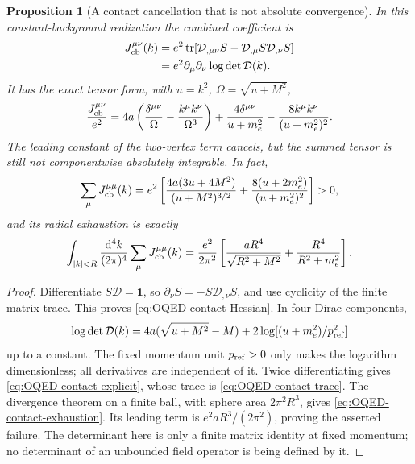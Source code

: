 \documentclass[final,5p,times,twocolumn,numbers,nopreprintline]{elsarticle}
\numberwithin{equation}{section}
\newtheorem{proposition}[theorem]{Proposition}
\theoremstyle{definition}
\theoremstyle{remark}
\newcommand{\dd}{\mathop{}\!\mathrm d}
\newcommand{\Tr}{\operatorname{tr}}
\newcommand{\one}{\mathbf 1}
\begin{document}
\begin{proposition}[A contact cancellation that is not absolute convergence]
\label{prop:OQED-constant-contact}
In this constant-background realization the combined coefficient is
\begin{equation}
\begin{aligned}
 J_{\rm cb}^{\mu\nu}(k)
 &=e^2\Tr[\mathcal D_{,\mu\nu}S
           -\mathcal D_{,\mu}S\mathcal D_{,\nu}S]\\
 &=e^2\partial_\mu\partial_\nu\log\det\mathcal D(k).
\end{aligned}
\label{eq:OQED-contact-Hessian}
\end{equation}
It has the exact tensor form, with \(u=k^2\), \(\Omega=\sqrt{u+M^2}\),
\begin{equation}
\begin{split}
 \frac{J_{\rm cb}^{\mu\nu}}{e^2}
 =4a\left(\frac{\delta^{\mu\nu}}{\Omega}
               -\frac{k^\mu k^\nu}{\Omega^3}\right)
   +\frac{4\delta^{\mu\nu}}{u+m_e^2}
               -\frac{8k^\mu k^\nu}{(u+m_e^2)^2}.
\end{split}
\label{eq:OQED-contact-explicit}
\end{equation}
The leading constant of the two-vertex term cancels, but the summed
tensor is still not componentwise absolutely integrable. In fact,
\begin{equation}
\begin{split}
 \sum_\mu J_{\rm cb}^{\mu\mu}(k)
 =e^2\left[
 \frac{4a(3u+4M^2)}{(u+M^2)^{3/2}}
       +\frac{8(u+2m_e^2)}{(u+m_e^2)^2}\right]>0,
\end{split}
\label{eq:OQED-contact-trace}
\end{equation}
and its radial exhaustion is exactly
\begin{equation}
 \int_{|k|<R}\frac{\dd^4k}{(2\pi)^4}
            \sum_\mu J_{\rm cb}^{\mu\mu}(k)
  =\frac{e^2}{2\pi^2}\left[
        \frac{aR^4}{\sqrt{R^2+M^2}}+\frac{R^4}{R^2+m_e^2}\right].
\label{eq:OQED-contact-exhaustion}
\end{equation}
\end{proposition}
\begin{proof}
Differentiate \(S\mathcal D=\one\), so
\(\partial_\nu S=-S\mathcal D_{,\nu}S\), and use cyclicity of the
finite matrix trace. This proves \eqref{eq:OQED-contact-Hessian}.
In four Dirac components,
\[
 \log\det\mathcal D(k)
   =4a(\sqrt{u+M^2}-M)+2\log[(u+m_e^2)/p_{\rm ref}^2]
\]
up to a constant. The fixed momentum unit \(p_{\rm ref}>0\) only makes
the logarithm dimensionless; all derivatives are independent of it.
Twice differentiating gives \eqref{eq:OQED-contact-explicit}, whose
trace is \eqref{eq:OQED-contact-trace}. The divergence theorem on a
finite ball, with sphere area \(2\pi^2R^3\), gives
\eqref{eq:OQED-contact-exhaustion}. Its leading term is
\(e^2aR^3/(2\pi^2)\), proving the asserted failure. The determinant
here is only a finite matrix identity at fixed momentum; no determinant
of an unbounded field operator is being defined by it.
\end{proof}
\end{document}
